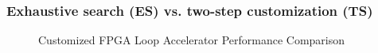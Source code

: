 \documentclass[accentcolor=tud1a,colorbacktitle,inverttitle,landscape,german,presentation,t]{tudbeamer}
\begin{document}
  \begin{frame}
  \frametitle{Exhaustive search (ES) vs. two-step customization (TS)}
  \vspace{-1em}
  \begin{figure}[htb]
  \centering
    \hfill
    \vspace{-0.6em}
    \caption{Customized FPGA Loop Accelerator Performance Comparison}
  \label{fig:DSE}
  \end{figure}

  \end{frame}
\end{document}
